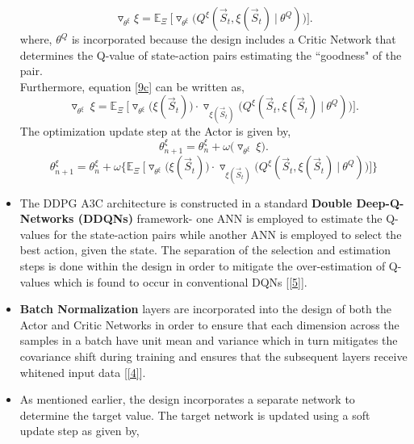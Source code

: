 \documentclass{article}
\begin{document}
\begin{itemize}
    \begin{equation}\label{9c}
        \triangledown_{\theta^{\xi}} \xi = \mathbb{E}_{\Xi}\ \Big[\triangledown_{\theta^{\xi}}\Big(Q^{\xi}(\vec{S}_t, \xi(\vec{S}_{t})\ |\ \theta^{Q})\Big)\Big].
    \end{equation}
    where, $\theta^{Q}$ is incorporated because the design includes a Critic Network that determines the Q-value of state-action pairs estimating the ``goodness" of the pair.
    \\Furthermore, equation \eqref{9c} can be written as,
    \begin{equation}\label{9d}
        \triangledown_{\theta^{\xi}}\ \xi = \mathbb{E}_{\Xi}\ \Big[\triangledown_{\theta^{\xi}} \Big(\xi(\vec{S}_t)\Big) \cdot \triangledown_{\xi(\vec{S}_t)} \Big(Q^{\xi}(\vec{S}_t, \xi(\vec{S}_t)\ |\ \theta^{Q})\Big)\Big].
    \end{equation}
    The optimization update step at the Actor is given by,
    \begin{equation}
        \theta^{\xi}_{n+1} = \theta^{\xi}_{n} + \omega\Big(\triangledown_{\theta^{\xi}}\ \xi\Big).
    \end{equation}
    \begin{equation}
        \theta^{\xi}_{n+1} = \theta^{\xi}_{n} + \omega \Big\{\mathbb{E}_{\Xi}\ \Big[\triangledown_{\theta^{\xi}} \Big(\xi(\vec{S}_t)\Big) \cdot \triangledown_{\xi(\vec{S}_t)} \Big(Q^{\xi}(\vec{S}_t, \xi(\vec{S}_t)\ |\ \theta^{Q})\Big)\Big]\Big\}
    \end{equation}
    \item The DDPG A3C architecture is constructed in a standard \textbf{Double Deep-Q-Networks (DDQNs)} framework- one ANN is employed to estimate the Q-values for the state-action pairs while another ANN is employed to select the best action, given the state. The separation of the selection and estimation steps is done within the design in order to mitigate the over-estimation of Q-values which is found to occur in conventional DQNs [\ref{5}].
    \item \textbf{Batch Normalization} layers are incorporated into the design of both the Actor and Critic Networks in order to ensure that each dimension across the samples in a batch have unit mean and variance which in turn mitigates the covariance shift during training and ensures that the subsequent layers receive whitened input data [\ref{4}].
    \item As mentioned earlier, the design incorporates a separate network to determine the target value. The target network is updated using a soft update step as given by,

\end{itemize}
\end{document}
